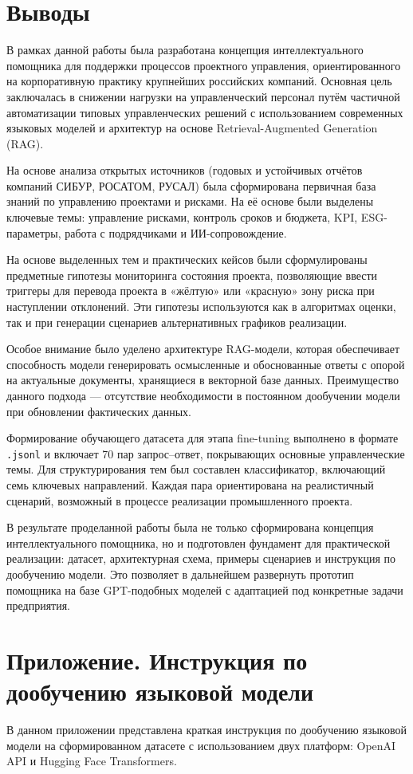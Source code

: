 \documentclass[12pt]{article}
\begin{document}
\section{Выводы}
В рамках данной работы была разработана концепция интеллектуального помощника для поддержки процессов проектного управления, ориентированного на корпоративную практику крупнейших российских компаний. Основная цель заключалась в снижении нагрузки на управленческий персонал путём частичной автоматизации типовых управленческих решений с использованием современных языковых моделей и архитектур на основе Retrieval-Augmented Generation (RAG).

На основе анализа открытых источников (годовых и устойчивых отчётов компаний СИБУР, РОСАТОМ, РУСАЛ) была сформирована первичная база знаний по управлению проектами и рисками. На её основе были выделены ключевые темы: управление рисками, контроль сроков и бюджета, KPI, ESG-параметры, работа с подрядчиками и ИИ-сопровождение.

На основе выделенных тем и практических кейсов были сформулированы предметные гипотезы мониторинга состояния проекта, позволяющие ввести триггеры для перевода проекта в «жёлтую» или «красную» зону риска при наступлении отклонений. Эти гипотезы используются как в алгоритмах оценки, так и при генерации сценариев альтернативных графиков реализации.

Особое внимание было уделено архитектуре RAG-модели, которая обеспечивает способность модели генерировать осмысленные и обоснованные ответы с опорой на актуальные документы, хранящиеся в векторной базе данных. Преимущество данного подхода — отсутствие необходимости в постоянном дообучении модели при обновлении фактических данных.

Формирование обучающего датасета для этапа fine-tuning выполнено в формате \texttt{.jsonl} и включает 70 пар запрос–ответ, покрывающих основные управленческие темы. Для структурирования тем был составлен классификатор, включающий семь ключевых направлений. Каждая пара ориентирована на реалистичный сценарий, возможный в процессе реализации промышленного проекта.

В результате проделанной работы была не только сформирована концепция интеллектуального помощника, но и подготовлен фундамент для практической реализации: датасет, архитектурная схема, примеры сценариев и инструкция по дообучению модели. Это позволяет в дальнейшем развернуть прототип помощника на базе GPT-подобных моделей с адаптацией под конкретные задачи предприятия.
\newpage
\section*{Приложение. Инструкция по дообучению языковой модели}
В данном приложении представлена краткая инструкция по дообучению языковой модели на сформированном датасете с использованием двух платформ: OpenAI API и Hugging Face Transformers.
\end{document}
